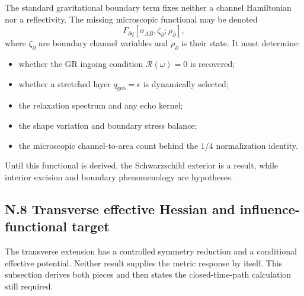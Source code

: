 \documentclass[11pt]{article}
\begin{document}
The standard gravitational boundary term fixes neither a channel Hamiltonian nor a reflectivity. The missing microscopic functional may be denoted
\[
\Gamma_{\partial q}
[\sigma_{AB},\zeta_{\partial};\rho_{\partial}],
\]
where $\zeta_{\partial}$ are boundary channel variables and $\rho_{\partial}$ is their state. It must determine:
\begin{itemize}
\item whether the GR ingoing condition $\mathcal R(\omega)=0$ is recovered;
\item whether a stretched layer $q_{\mathrm{geo}}=\epsilon$ is dynamically selected;
\item the relaxation spectrum and any echo kernel;
\item the shape variation and boundary stress balance;
\item the microscopic channel-to-area count behind the $1/4$ normalization identity.
\end{itemize}
Until this functional is derived, the Schwarzschild exterior is a result, while interior excision and boundary phenomenology are hypotheses.

\subsection*{N.8 Transverse effective Hessian and influence-functional target}

The transverse extension has a controlled symmetry reduction and a conditional effective potential. Neither result supplies the metric response by itself. This subsection derives both pieces and then states the closed-time-path calculation still required.
\end{document}

